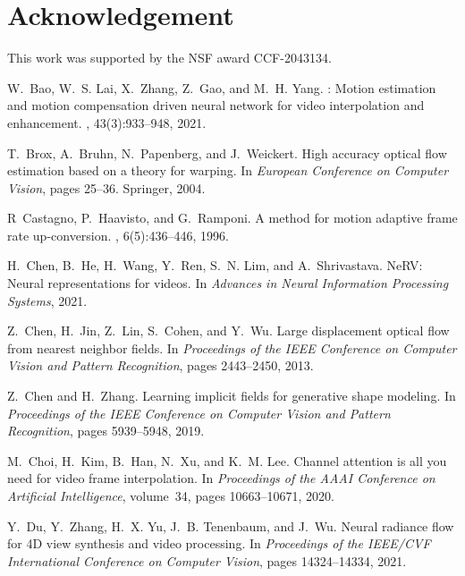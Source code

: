 \documentclass[12pt]{article}
\begin{document}
\section*{Acknowledgement}
This work was supported by the NSF award CCF-2043134.

\begin{thebibliography}{10}

W.~Bao, W.~S. Lai, X.~Zhang, Z.~Gao, and M.~H. Yang.
: Motion estimation and motion compensation driven neural
  network for video interpolation and enhancement.
,
  43(3):933--948, 2021.

T.~Brox, A.~Bruhn, N.~Papenberg, and J.~Weickert.
\newblock High accuracy optical flow estimation based on a theory for warping.
\newblock In {\em European Conference on Computer Vision}, pages 25--36.
  Springer, 2004.

R~Castagno, P.~Haavisto, and G.~Ramponi.
\newblock A method for motion adaptive frame rate up-conversion.
,
  6(5):436--446, 1996.

H.~Chen, B.~He, H.~Wang, Y.~Ren, S.~N. Lim, and A.~Shrivastava.
\newblock Ne{RV}: Neural representations for videos.
\newblock In {\em Advances in Neural Information Processing Systems}, 2021.

Z.~Chen, H.~Jin, Z.~Lin, S.~Cohen, and Y.~Wu.
\newblock Large displacement optical flow from nearest neighbor fields.
\newblock In {\em Proceedings of the IEEE Conference on Computer Vision and
  Pattern Recognition}, pages 2443--2450, 2013.

Z.~Chen and H.~Zhang.
\newblock Learning implicit fields for generative shape modeling.
\newblock In {\em Proceedings of the IEEE Conference on Computer Vision and
  Pattern Recognition}, pages 5939--5948, 2019.

M.~Choi, H.~Kim, B.~Han, N.~Xu, and K.~M. Lee.
\newblock Channel attention is all you need for video frame interpolation.
\newblock In {\em Proceedings of the AAAI Conference on Artificial
  Intelligence}, volume~34, pages 10663--10671, 2020.

Y.~Du, Y.~Zhang, H.~X. Yu, J.~B. Tenenbaum, and J.~Wu.
\newblock Neural radiance flow for {4D} view synthesis and video processing.
\newblock In {\em Proceedings of the IEEE/CVF International Conference on
  Computer Vision}, pages 14324--14334, 2021.


\end{thebibliography}
\end{document}
